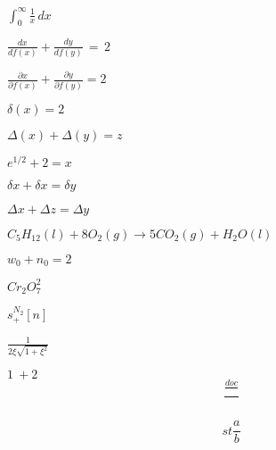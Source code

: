 \documentclass{article}
\begin{document}
$\int_0^{\infty} \frac{1}{x}\, dx$

$\frac{dx}{df(x)} + \frac{dy}{df(y)}\, =\, 2$

$\frac{\partial x}{\partial f(x)} + \frac{\partial y}{\partial f(y)} = 2$

$\delta (x) = 2$

$\Delta (x) + \Delta (y) = z$

$e^{1/2} + 2 = x$

$\delta x + \delta x = \delta y$

$\Delta x + \Delta z = \Delta y$

$C_5H_{12}(l)+8O_2(g)\rightarrow 5CO_2(g)+H_2O(l)$

$w_0 + n_0 = 2$

$Cr_2O_7^2$

$s^{N_2}_+ [n]$

$\frac{1}{2\xi \sqrt{1+\xi^2}}$

$1\: + 2$
\[
  \frac{ \frac{doc}{}}{}
\]

\[
  st
  \frac{a}{b}
\]
\end{document}
